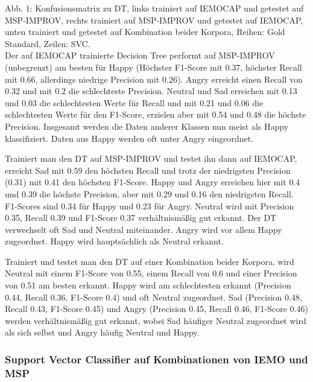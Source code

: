 \documentclass{article} %
\begin{document}
Abb. 1: Konfusionsmatrix zu DT, links trainiert auf IEMOCAP und getestet auf MSP-IMPROV, rechts trainiert auf MSP-IMPROV und getestet auf IEMOCAP, unten trainiert und getestet auf Kombination beider Korpora, Reihen: Gold Standard, Zeilen: SVC. \\
Der auf IEMOCAP trainierte Decision Tree performt auf MSP-IMPROV (unbegrenzt) am besten für Happy (Höchster F1-Score mit 0.37, höchster Recall mit 0.66, allerdings niedrige Precision mit 0.26). Angry erreicht einen Recall von 0.32 und mit 0.2 die schlechteste Precision. Neutral und Sad erreichen mit 0.13 und 0.03 die schlechtesten Werte für Recall und mit 0.21 und 0.06 die schlechtesten Werte für den F1-Score, erzielen aber mit 0.54 und 0.48 die höchste Precision. 
Insgesamt werden die Daten anderer Klassen nun meist als Happy klassifiziert. Daten aus Happy werden oft unter Angry eingeordnet. 

Trainiert man den DT auf MSP-IMPROV und testet ihn dann auf IEMOCAP, erreicht Sad mit 0.59 den höchsten Recall und trotz der niedrigsten Precision (0.31) mit 0.41 den höchsten F1-Score. 
Happy und Angry erreichen hier mit 0.4 und 0.39 die höchste Precision, aber mit 0.29 und 0.16 den niedrigsten Recall. F1-Scores sind 0.34 für Happy und 0.23 für Angry. Neutral wird mit Precision 0.35, Recall 0.39 und F1-Score 0.37 verhältnismäßig gut erkannt. 
Der DT verwechselt oft Sad und Neutral miteinander. Angry wird vor allem Happy zugeordnet. Happy wird hauptsächlich als Neutral erkannt. 

Trainiert und testet man den DT auf einer Kombination beider Korpora, wird Neutral mit einem F1-Score von 0.55, einem Recall von 0.6 und einer Precision von 0.51 am besten erkannt. Happy wird am schlechtesten erkannt (Precision 0.44, Recall 0.36, F1-Score 0.4) und oft Neutral zugeordnet. Sad (Precision 0.48, Recall 0.43, F1-Score 0.45) und Angry (Precision 0.45, Recall 0.46, F1-Score 0.46) werden verhältnismäßig gut erkannt, wobei Sad häufiger Neutral zugeordnet wird als sich selbst und Angry häufig Neutral und Happy. 

\subsubsection{Support Vector Classifier auf Kombinationen von IEMO und MSP}
\end{document}
